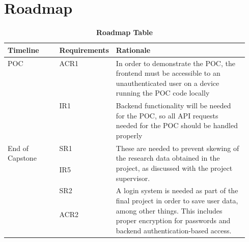 \documentclass{article}
\begin{document}
\section{Roadmap}
\begin{table}[H]
\renewcommand{\arraystretch}{1.75}
\begin{adjustwidth}{-1.6in}{-1in}
\caption{\bf Roadmap Table}
\centering
\begin{tabular}{|l|l|p{0.55\linewidth}|}
\hline
\textbf{Timeline}                & \textbf{Requirements} & \textbf{Rationale}                                                                                                                                                                                                              \\ \hline
\multirow{2}{*}{POC}             & ACR1                  & In order to demonstrate the POC, the frontend must be accessible to an unauthenticated user on a device running the POC code locally                                                                                            \\ \cline{2-3} 
                                 & IR1                   & Backend functionality will be needed for the POC, so all API requests needed for the POC should be handled properly                                                                                                             \\ \hline
\multirow{9}{*}{End of Capstone} & SR1                   & \multirow{2}{\linewidth}{These are needed to prevent skewing of the research data obtained in the project, as discussed with the project supervisor.}                                                                                    \\ \cline{2-2}
                                 &IR5                   &                                                                                                                                                                                                                              \\ \cline{2-3}
                                 & SR2                   & \multirow{3}{\linewidth}{A login system is needed as part of the final project in order to save user data, among other things. This includes proper encryption for passwords and backend authentication-based access.}                   \\ \cline{2-2}
                                 & ACR2                  &                                                                                                                                                                                                                                 \\ \cline{2-2}

\end{tabular}
\end{adjustwidth}
\end{table}
\end{document}
